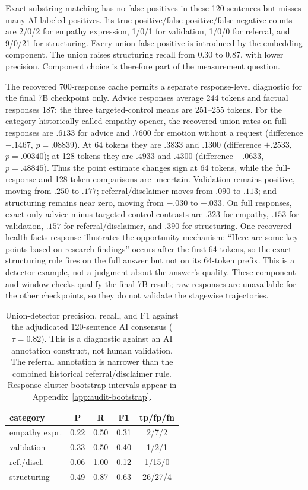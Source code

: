 \documentclass[11pt]{article}
\begin{document}
Exact substring matching has no false positives in these 120 sentences but
misses many AI-labeled positives. Its true-positive/false-positive/false-negative
counts are 2/0/2 for empathy expression, 1/0/1 for validation, 1/0/0 for
referral, and 9/0/21 for structuring. Every union false positive is introduced
by the embedding component. The union raises structuring recall from 0.30 to
0.87, with lower precision. Component choice is therefore part of the
measurement question.

The recovered 700-response cache permits a separate response-level diagnostic
for the final 7B checkpoint only. Advice responses average 244 tokens and
factual responses 187; the three targeted-control means are 251--255 tokens.
For the category historically called empathy-opener, the recovered union rates
on full responses are $.6133$ for advice and $.7600$ for emotion without a
request (difference $-.1467$, $p=.08839$). At 64 tokens they are $.3833$ and
$.1300$ (difference $+.2533$, $p=.00340$); at 128 tokens they are $.4933$ and
$.4300$ (difference $+.0633$, $p=.48845$). Thus the point estimate changes sign
at 64 tokens, while the full-response and 128-token comparisons are uncertain.
Validation remains positive, moving
from $.250$ to $.177$; referral/disclaimer moves from $.090$ to $.113$; and
structuring remains near zero, moving from $-.030$ to $-.033$. On full
responses, exact-only advice-minus-targeted-control contrasts are $.323$ for
empathy, $.153$ for validation, $.157$ for referral/disclaimer, and $.390$ for
structuring. One recovered health-facts response illustrates the opportunity
mechanism: ``Here are some key points based on research findings'' occurs after
the first 64 tokens, so the exact structuring rule fires on the full answer but
not on its 64-token prefix. This is a detector example, not a judgment about the
answer's quality. These component and window checks qualify the final-7B result; raw
responses are unavailable for the other checkpoints, so they do not validate
the stagewise trajectories.

\begin{table}[t]
\centering
\small
\begin{tabular}{lcccc}
\toprule
category & P & R & F1 & tp/fp/fn \\
\midrule
empathy expr. & 0.22 & 0.50 & 0.31 & 2/7/2 \\
validation & 0.33 & 0.50 & 0.40 & 1/2/1 \\
ref./discl. & 0.06 & 1.00 & 0.12 & 1/15/0 \\
structuring & 0.49 & 0.87 & 0.63 & 26/27/4 \\
\bottomrule
\end{tabular}
\caption{Union-detector precision, recall, and F1 against the adjudicated
120-sentence AI consensus ($\tau=0.82$). This is a diagnostic against an AI
annotation construct, not human validation. The referral annotation is narrower
than the combined historical referral/disclaimer rule. Response-cluster
bootstrap intervals appear in Appendix~\ref{app:audit-bootstrap}.}
\label{tab:detval}
\end{table}
\end{document}
